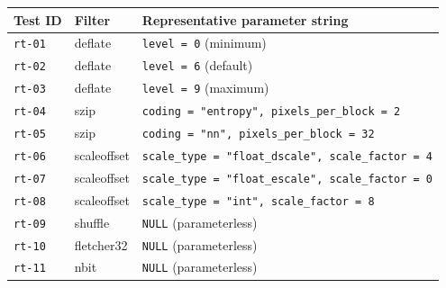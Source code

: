 \documentclass[../RFC-HDFG-2026-001.tex]{subfiles}
\begin{document}
\begin{center}
\small
\renewcommand{\arraystretch}{1.25}
\begin{tabularx}{\textwidth}{llX}
\toprule
\textbf{Test ID} & \textbf{Filter} & \textbf{Representative parameter string} \\
\midrule
\texttt{rt-01} & deflate    & \texttt{level = 0} (minimum) \\
\texttt{rt-02} & deflate    & \texttt{level = 6} (default) \\
\texttt{rt-03} & deflate    & \texttt{level = 9} (maximum) \\
\texttt{rt-04} & szip       & \texttt{coding = "entropy", pixels\_per\_block = 2} \\
\texttt{rt-05} & szip       & \texttt{coding = "nn", pixels\_per\_block = 32} \\
\texttt{rt-06} & scaleoffset & \texttt{scale\_type = "float\_dscale", scale\_factor = 4} \\
\texttt{rt-07} & scaleoffset & \texttt{scale\_type = "float\_escale", scale\_factor = 0} \\
\texttt{rt-08} & scaleoffset & \texttt{scale\_type = "int", scale\_factor = 8} \\
\texttt{rt-09} & shuffle    & \texttt{NULL} (parameterless) \\
\texttt{rt-10} & fletcher32 & \texttt{NULL} (parameterless) \\
\texttt{rt-11} & nbit       & \texttt{NULL} (parameterless) \\
\bottomrule
\end{tabularx}
\end{center}
\end{document}
